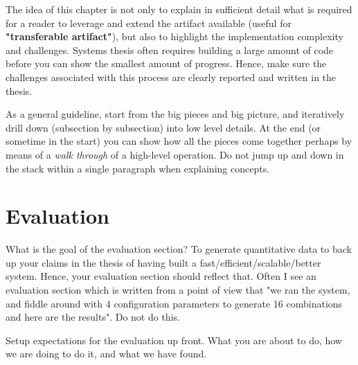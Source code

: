 \documentclass{article}
\begin{document}
The idea of this chapter is not only to explain in sufficient detail what is required for a reader to leverage and extend the artifact available (useful for \textbf{"transferable artifact"}), but also to highlight the implementation complexity and challenges. Systems thesis often requires building a large amount of code before you can show the smallest amount of progress. Hence, make sure the challenges associated with this process are clearly reported and written in the thesis. 


As a general guideline, start from the big pieces and big picture, and iteratively drill down (subsection by subsection) into low level details. At the end (or sometime in the start) you can show how all the pieces come together perhaps by means of a \textit{walk through} of a high-level operation. Do not jump up and down in the stack within a single paragraph when explaining concepts. 

\newpage 
\section{Evaluation}
What is the goal of the evaluation section? To generate quantitative data to back up your claims in the thesis of having built a fast/efficient/scalable/better system. Hence, your evaluation section should reflect that. Often I see an evaluation section which is written from a point of view that "we ran the system, and fiddle around with 4 configuration parameters to generate 16 combinations and here are the results". Do not do this. 

Setup expectations for the evaluation up front. What you are about to do, how we are doing to do it, and what we have found. 
\end{document}

